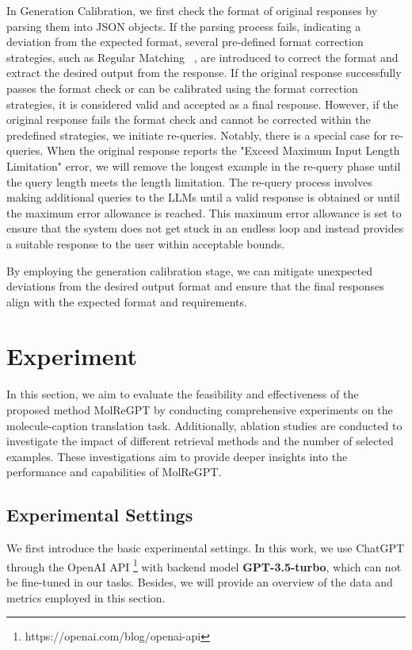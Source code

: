 \documentclass{article}
\theoremstyle{plain}
\theoremstyle{definition}
\theoremstyle{remark}
\begin{document}
In Generation Calibration, we first check the format of original responses by parsing them into JSON objects.
If the parsing process fails, indicating a deviation from the expected format, 
several pre-defined format correction strategies, such as Regular Matching ~\cite{thompson1968programming}, are introduced to correct the format and extract the desired output from the response. 
If the original response successfully passes the format check or can be calibrated using the format correction strategies, it is considered valid and accepted as a final response. 
However, if the original response fails the format check and cannot be corrected within the predefined strategies, we initiate re-queries. 
Notably, there is a special case for re-queries. When the original response reports the "Exceed Maximum Input Length Limitation" error, we will remove the longest example in the re-query phase until the query length meets the length limitation.
The re-query process involves making additional queries to the LLMs until a valid response is obtained or until the maximum error allowance is reached. This maximum error allowance is set to ensure that the system does not get stuck in an endless loop and instead provides a suitable response to the user within acceptable bounds.

By employing the generation calibration stage, we can mitigate unexpected deviations from the desired output format and ensure that the final responses align with the expected format and requirements. \section{Experiment}
\label{sec:Experiments}
In this section, we aim to evaluate the feasibility and effectiveness of the proposed method MolReGPT by conducting comprehensive experiments on the molecule-caption translation task. 
Additionally, ablation studies are conducted to investigate the impact of different retrieval methods and the number of selected examples. These investigations aim to provide deeper insights into the performance and capabilities of MolReGPT.


\subsection{Experimental Settings}
We first introduce the basic experimental settings. In this work, we use ChatGPT through the OpenAI API \footnote{https://openai.com/blog/openai-api} with backend model \textbf{GPT-3.5-turbo}, which can not be fine-tuned in our tasks. 
Besides, we will provide an overview of the data and metrics employed in this section.
\end{document}
